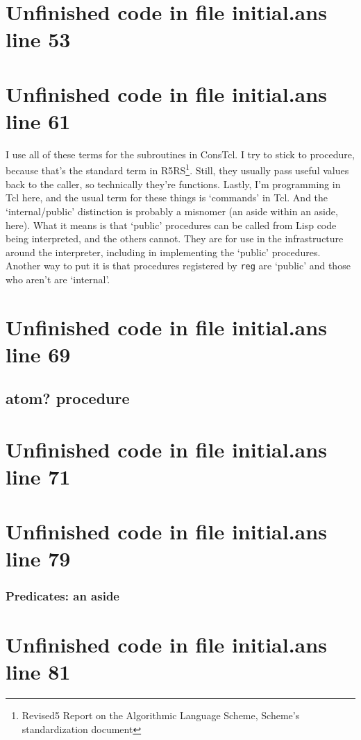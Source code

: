 \documentclass[twoside,9pt]{report}
\begin{document}
\section{Unfinished code in file initial.ans line 53}

\section{Unfinished code in file initial.ans line 61}

I use all of these terms for the subroutines in ConsTcl. I try to stick to procedure, because that's the standard term in R5RS\footnote{Revised5 Report on the Algorithmic Language Scheme, Scheme's standardization document}. Still, they usually pass useful values back to the caller, so technically they're functions. Lastly, I'm programming in Tcl here, and the usual term for these things is `commands' in Tcl. And the `internal/public' distinction is probably a misnomer (an aside within an aside, here). What it means is that `public' procedures can be called from Lisp code being interpreted, and the others cannot. They are for use in the infrastructure around the interpreter, including in implementing the `public' procedures. Another way to put it is that procedures registered by \texttt{reg} are `public' and those who aren't are `internal'.

\section{Unfinished code in file initial.ans line 69}
\subsection{atom? procedure}
\label{atom?-procedure}
\section{Unfinished code in file initial.ans line 71}

\section{Unfinished code in file initial.ans line 79}
\subsubsection{Predicates: an aside}
\label{predicates-an-aside}
\section{Unfinished code in file initial.ans line 81}
\end{document}
